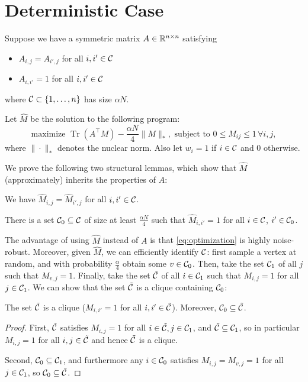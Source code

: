 \documentclass[11pt]{article}
\DeclareMathOperator{\Tr}{Tr}
\newcommand{\M}{\hat{M}}
\begin{document}
\section{Deterministic Case}
Suppose we have a symmetric matrix $A \in \mathbb{R}^{n \times n}$ satisfying 
\begin{itemize}
\item $A_{i,j} = A_{i',j}$ for all $i,i' \in \mathcal{C}$
\item $A_{i,i'} = 1$ for all $i,i' \in \mathcal{C}$
\end{itemize}
where $\mathcal{C} \subset \{1,\ldots,n\}$ has size $\alpha N$.

Let $\M$ be the solution to the following program:
\begin{equation}
\label{eq:optimization}
\text{maximize } \Tr(A^{\top}M) - \frac{\alpha N}{4} \|M\|_*, \text{ subject to } 0 \leq M_{ij} \leq 1 \, \forall i,j,
\end{equation}
where $\|\cdot\|_*$ denotes the nuclear norm. Also let $w_i = 1$ if $i \in \mathcal{C}$ and $0$ otherwise.

We prove the following two structural lemmas, which show that 
$\M$ (approximately) inherits the properties of $A$:
\begin{lemma}
\label{lem:constant}
We have $\M_{i,j} = \M_{i',j}$ for all $i,i' \in \mathcal{C}$.
\end{lemma}

\begin{lemma}
\label{lem:ones}
There is a set $\mathcal{C}_0 \subseteq \mathcal{C}$ of size at least 
$\frac{\alpha N}{4}$ such that 
$\M_{i,i'} = 1$ for all $i \in \mathcal{C}$, $i' \in \mathcal{C}_0$.
\end{lemma}
The advantage of using $\M$ instead of $A$ is that \eqref{eq:optimization} is highly 
noise-robust. Moreover, given $\M$, we can efficiently identify $\mathcal{C}$: first sample 
a vertex at random, and with probability $\frac{\alpha}{4}$ obtain some $v \in \mathcal{C}_0$. 
Then, take the set $\mathcal{C}_1$ of all $j$ such that $M_{v,j} = 1$. Finally, take the set 
$\tilde{\mathcal{C}}$ of all $i \in \mathcal{C}_1$ such that $M_{i,j} = 1$ for all $j \in \mathcal{C}_1$. 
We can show that the set $\tilde{\mathcal{C}}$ is a clique containing $\mathcal{C}_0$:
\begin{lemma}
\label{lem:clique}
The set $\tilde{\mathcal{C}}$ is a clique ($M_{i,i'} = 1$ for all $i,i' \in \tilde{\mathcal{C}}$). 
Moreover, $\mathcal{C}_0 \subseteq \tilde{\mathcal{C}}$.
\end{lemma}
\begin{proof}
First, $\tilde{\mathcal{C}}$ satisfies $M_{i,j} = 1$ for all $i \in \tilde{\mathcal{C}}, j \in \mathcal{C}_1$, 
and $\tilde{\mathcal{C}} \subseteq \mathcal{C}_1$, so in particular $M_{i,j} = 1$ for all $i,j \in \tilde{\mathcal{C}}$ 
and hence $\tilde{\mathcal{C}}$ is a clique.

Second, $\mathcal{C}_0 \subseteq \mathcal{C}_1$, and furthermore any $i \in \mathcal{C}_0$ satisfies 
$M_{i,j} = M_{v,j} = 1$ for all $j \in \mathcal{C}_1$, so $\mathcal{C}_0 \subseteq \tilde{\mathcal{C}}$.
\end{proof}
\end{document}
